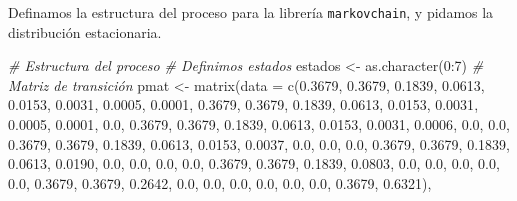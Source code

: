 \documentclass[
]{book}
\newenvironment{Shaded}{\begin{snugshade}}{\end{snugshade}}
\newcommand{\AttributeTok}[1]{\textcolor[rgb]{0.77,0.63,0.00}{#1}}
\newcommand{\CommentTok}[1]{\textcolor[rgb]{0.56,0.35,0.01}{\textit{#1}}}
\newcommand{\DecValTok}[1]{\textcolor[rgb]{0.00,0.00,0.81}{#1}}
\newcommand{\FloatTok}[1]{\textcolor[rgb]{0.00,0.00,0.81}{#1}}
\newcommand{\FunctionTok}[1]{\textcolor[rgb]{0.00,0.00,0.00}{#1}}
\newcommand{\NormalTok}[1]{#1}
\newcommand{\OtherTok}[1]{\textcolor[rgb]{0.56,0.35,0.01}{#1}}
\newcommand{\SpecialCharTok}[1]{\textcolor[rgb]{0.00,0.00,0.00}{#1}}
\theoremstyle{definition}
\theoremstyle{definition}
\theoremstyle{definition}
\theoremstyle{definition}
\theoremstyle{remark}
\begin{document}
Definamos la estructura del proceso para la librería \texttt{markovchain}, y pidamos la distribución estacionaria.

\begin{Shaded}
\begin{Highlighting}[]
\CommentTok{\# Estructura del proceso}
\CommentTok{\# Definimos estados}
\NormalTok{estados }\OtherTok{\textless{}{-}} \FunctionTok{as.character}\NormalTok{(}\DecValTok{0}\SpecialCharTok{:}\DecValTok{7}\NormalTok{)}
\CommentTok{\# Matriz de transición }
\NormalTok{pmat }\OtherTok{\textless{}{-}} \FunctionTok{matrix}\NormalTok{(}\AttributeTok{data =} \FunctionTok{c}\NormalTok{(}\FloatTok{0.3679}\NormalTok{, }\FloatTok{0.3679}\NormalTok{, }\FloatTok{0.1839}\NormalTok{, }\FloatTok{0.0613}\NormalTok{, }\FloatTok{0.0153}\NormalTok{, }
                        \FloatTok{0.0031}\NormalTok{, }\FloatTok{0.0005}\NormalTok{, }\FloatTok{0.0001}\NormalTok{,}
\FloatTok{0.3679}\NormalTok{, }\FloatTok{0.3679}\NormalTok{, }\FloatTok{0.1839}\NormalTok{, }\FloatTok{0.0613}\NormalTok{, }\FloatTok{0.0153}\NormalTok{, }\FloatTok{0.0031}\NormalTok{, }\FloatTok{0.0005}\NormalTok{, }\FloatTok{0.0001}\NormalTok{,}
\FloatTok{0.0}\NormalTok{, }\FloatTok{0.3679}\NormalTok{, }\FloatTok{0.3679}\NormalTok{, }\FloatTok{0.1839}\NormalTok{, }\FloatTok{0.0613}\NormalTok{, }\FloatTok{0.0153}\NormalTok{, }\FloatTok{0.0031}\NormalTok{, }\FloatTok{0.0006}\NormalTok{,}
\FloatTok{0.0}\NormalTok{, }\FloatTok{0.0}\NormalTok{, }\FloatTok{0.3679}\NormalTok{, }\FloatTok{0.3679}\NormalTok{, }\FloatTok{0.1839}\NormalTok{, }\FloatTok{0.0613}\NormalTok{, }\FloatTok{0.0153}\NormalTok{, }\FloatTok{0.0037}\NormalTok{,}
\FloatTok{0.0}\NormalTok{, }\FloatTok{0.0}\NormalTok{, }\FloatTok{0.0}\NormalTok{, }\FloatTok{0.3679}\NormalTok{, }\FloatTok{0.3679}\NormalTok{, }\FloatTok{0.1839}\NormalTok{, }\FloatTok{0.0613}\NormalTok{, }\FloatTok{0.0190}\NormalTok{,}
\FloatTok{0.0}\NormalTok{, }\FloatTok{0.0}\NormalTok{, }\FloatTok{0.0}\NormalTok{, }\FloatTok{0.0}\NormalTok{, }\FloatTok{0.3679}\NormalTok{, }\FloatTok{0.3679}\NormalTok{, }\FloatTok{0.1839}\NormalTok{, }\FloatTok{0.0803}\NormalTok{,}
\FloatTok{0.0}\NormalTok{, }\FloatTok{0.0}\NormalTok{, }\FloatTok{0.0}\NormalTok{, }\FloatTok{0.0}\NormalTok{, }\FloatTok{0.0}\NormalTok{, }\FloatTok{0.3679}\NormalTok{, }\FloatTok{0.3679}\NormalTok{, }\FloatTok{0.2642}\NormalTok{,}
\FloatTok{0.0}\NormalTok{, }\FloatTok{0.0}\NormalTok{, }\FloatTok{0.0}\NormalTok{, }\FloatTok{0.0}\NormalTok{, }\FloatTok{0.0}\NormalTok{, }\FloatTok{0.0}\NormalTok{, }\FloatTok{0.3679}\NormalTok{, }\FloatTok{0.6321}\NormalTok{), }

\end{Highlighting}
\end{Shaded}
\end{document}

